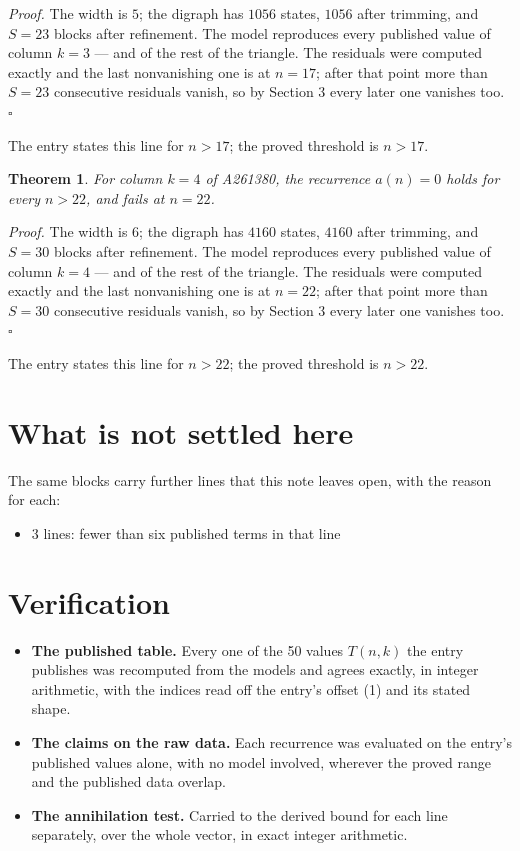 \documentclass[11pt]{article}
\newtheorem{theorem}{Theorem}
\theoremstyle{definition}
\begin{document}
{\itshape Proof.} The width is $5$; the digraph has $1056$ states, $1056$ after trimming, and $S = 23$ blocks after refinement. The model reproduces every published value of column $k = 3$ --- and of the rest of the triangle. The residuals were computed exactly and the last nonvanishing one is at $n = 17$; after that point more than $S = 23$ consecutive residuals vanish, so by Section 3 every later one vanishes too. $\square$

The entry states this line for $n > 17$; the proved threshold is $n > 17$.

\begin{theorem} For column $k = 4$ of A261380, the recurrence $a(n) = 0$ holds for every $n > 22$, and fails at $n = 22$.\end{theorem}

{\itshape Proof.} The width is $6$; the digraph has $4160$ states, $4160$ after trimming, and $S = 30$ blocks after refinement. The model reproduces every published value of column $k = 4$ --- and of the rest of the triangle. The residuals were computed exactly and the last nonvanishing one is at $n = 22$; after that point more than $S = 30$ consecutive residuals vanish, so by Section 3 every later one vanishes too. $\square$

The entry states this line for $n > 22$; the proved threshold is $n > 22$.

\section{What is not settled here}

The same blocks carry further lines that this note leaves open, with the reason for each:

\begin{itemize}

\item 3 lines: fewer than six published terms in that line

\end{itemize}

\section{Verification}

\begin{itemize}

\item {\bfseries The published table.} Every one of the 50 values $T(n,k)$ the entry publishes was recomputed from the models and agrees exactly, in integer arithmetic, with the indices read off the entry's offset (1) and its stated shape.

\item {\bfseries The claims on the raw data.} Each recurrence was evaluated on the entry's published values alone, with no model involved, wherever the proved range and the published data overlap.

\item {\bfseries The annihilation test.} Carried to the derived bound for each line separately, over the whole vector, in exact integer arithmetic.

\end{itemize}
\end{document}
